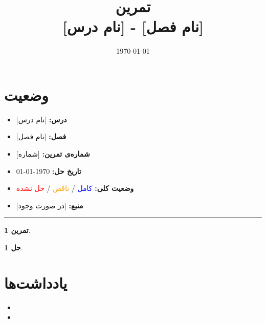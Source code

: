 \documentclass[a4paper,12pt]{article}
\title{%
	\Huge \textbf{تمرین} \\[0.3cm]
	\Large [نام درس] - [نام فصل]
}
\author{\lr{Ali Ashouri}}
\date{\today}
\theoremstyle{plain}
\newtheorem{exercise}{تمرین}
\newtheorem{solution}{حل}
\begin{document}
	
	\maketitle
	
	\section*{وضعیت}
	\begin{itemize}
		\item \textbf{درس:} [نام درس]
		\item \textbf{فصل:} [نام فصل]
		\item \textbf{شماره‌ی تمرین:} [شماره]
		\item \textbf{تاریخ حل:} \today
		\item \textbf{وضعیت کلی:} \textcolor{blue}{کامل} / \textcolor{orange}{ناقص} / \textcolor{red}{حل نشده}
		\item \textbf{منبع:} [در صورت وجود]
	\end{itemize}
	\rule{\textwidth}{0.4pt}
	
	\begin{exercise}
	
	\end{exercise}
	
	\begin{solution}
	
	\end{solution}
	
	\section*{یادداشت‌ها}
	\begin{itemize}
		\item [یادداشت اول]
		\item [یادداشت دوم]
	\end{itemize}
	
\end{document}
